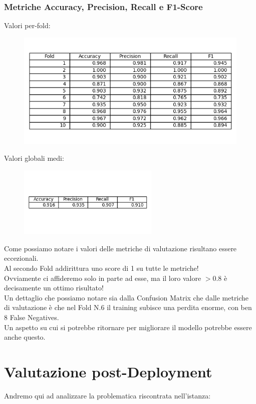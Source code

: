 \documentclass[a4paper,12pt]{report}
\begin{document}
\subsubsection{Metriche Accuracy, Precision, Recall e F1-Score}
Valori per-fold:
\begin{figure}[h]
\centering
\includegraphics[width=\textwidth]{table.png}
\end{figure}
\hfill \break
Valori globali medi:
\begin{figure}[h]
\centering
\includegraphics[width=0.6\textwidth]{table_globalaverage.png}
\end{figure}
\hfill \break
Come possiamo notare i valori delle metriche di valutazione risultano essere eccezionali.\\
Al secondo Fold addirittura uno score di 1 su tutte le metriche!\\
Ovviamente ci affideremo solo in parte ad esse, ma il loro valore \(> 0.8\) è decisamente un ottimo risultato!\\
Un dettaglio che possiamo notare sia dalla Confusion Matrix che dalle metriche di valutazione è che nel Fold N.6 il training subisce una perdita enorme, con ben 8 False Negatives.\\
Un aspetto su cui si potrebbe ritornare per migliorare il modello potrebbe essere anche questo.
\newpage
\section{Valutazione post-Deployment}
Andremo qui ad analizzare la problematica riscontrata nell'istanza:
\end{document}
